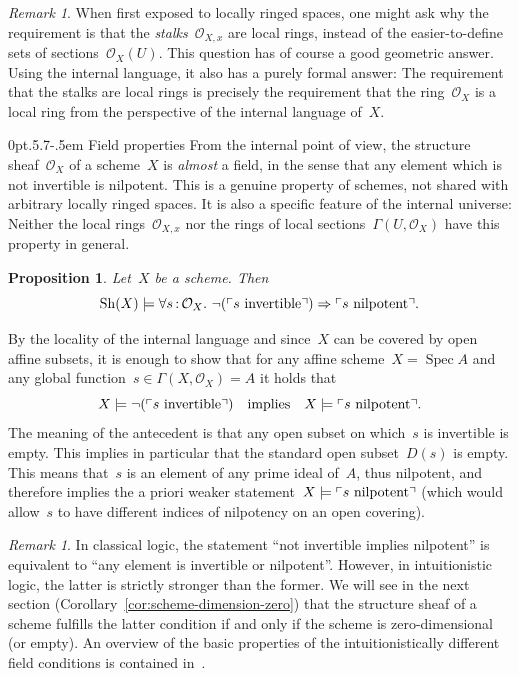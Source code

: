 \documentclass[10pt,reqno,a4paper]{amsbook}
\makeatletter
\theoremstyle{definition}
\theoremstyle{plain}
\newtheorem{prop}[defn]{Proposition}
\theoremstyle{remark}
\newtheorem{rem}[defn]{Remark}
\renewcommand{\O}{\mathcal{O}}
\newcommand{\Sh}{\mathrm{Sh}}
\DeclareMathOperator{\Spec}{Spec}
\newcommand{\?}{\,{:}\,}
\renewcommand{\_}{\mathpunct{.}\,}
\newcommand{\speak}[1]{\ulcorner\text{\textnormal{#1}}\urcorner}
\renewenvironment{proof}[1][\proofname]{\par
  \pushQED{\qed}%
  \normalfont \topsep6\p@\@plus6\p@\relax
  \trivlist
  \item[\hskip\labelsep
        \itshape
    #1\@addpunct{.}]\ignorespaces
}{%
  \popQED\endtrivlist\@endpefalse
}
\def\subsection{\@startsection{subsection}{2}%
  {0pt}{.5\linespacing\@plus.7\linespacing}{-.5em}%
  {\normalfont\bfseries}}
\makeatother
\begin{document}
\begin{rem}When first exposed to locally ringed spaces, one might ask why the
requirement is that the \emph{stalks}~$\O_{X,x}$ are local rings, instead of the
easier-to-define sets of sections~$\O_X(U)$. This question has of course a good
geometric answer. Using the internal language, it also has a purely formal
answer: The requirement that the stalks are local rings is precisely the
requirement that the ring~$\O_X$ is a local ring from the perspective of the
internal language of~$X$.
\end{rem}


\subsection{Field properties}\label{sect:field-properties}
From the internal point of view, the structure
sheaf~$\O_X$ of a scheme~$X$ is \emph{almost} a field, in the sense that any
element which is not invertible is nilpotent. This is a genuine property of
schemes, not shared with arbitrary locally ringed spaces. It is also a specific
feature of the internal universe: Neither the local rings~$\O_{X,x}$ nor the
rings of local sections~$\Gamma(U,\O_X)$ have this property in general.

\begin{prop}\label{prop:neginvnilpotent}Let~$X$ be a scheme. Then
\[ \Sh(X) \models \forall s\?\O_X\_ \neg(\speak{$s$ invertible}) \Rightarrow
\speak{$s$ nilpotent}. \]
\end{prop}
\begin{proof}By the locality of the internal language and since~$X$ can be
covered by open affine subsets, it is enough to show that for any affine
scheme~$X = \Spec A$ and any global function~$s \in \Gamma(X,\O_X) = A$ it holds
that
\[ X \models \neg(\speak{$s$ invertible}) \quad\text{implies}\quad
  X \models \speak{$s$ nilpotent}. \]
The meaning of the antecedent is that any open subset on which~$s$ is
invertible is empty. This implies in particular that the standard open subset~$D(s)$ is
empty. This means that~$s$ is an element of any prime ideal of~$A$, thus
nilpotent, and therefore implies the a priori weaker statement~$X \models \speak{$s$
nilpotent}$ (which would allow~$s$ to have different indices of nilpotency on
an open covering).
\end{proof}

\begin{rem}In classical logic, the statement ``not invertible implies
nilpotent'' is equivalent to ``any element is invertible or nilpotent''.
However, in intuitionistic logic, the latter is strictly stronger than the
former. We will see in the next section
(Corollary~\ref{cor:scheme-dimension-zero}) that the structure sheaf of a
scheme fulfills the latter condition if and only if the scheme is
zero-dimensional (or empty). An overview of the basic properties of the
intuitionistically different field conditions is contained
in~\cite{johnstone:rings-fields-and-spectra}.
\end{rem}
\end{document}
